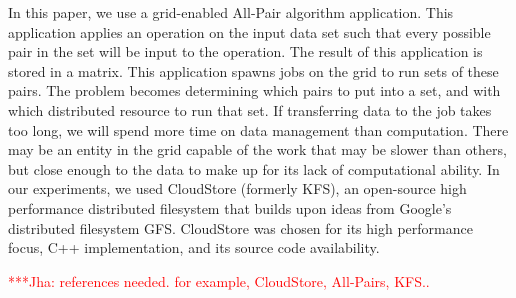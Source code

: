 \documentclass[a4paper,11pt]{article}
\newcommand{\jhanote}[1]{ {\textcolor{red} { ***Jha: #1 }}}
\newcommand{\jhanote}[1]{}
\begin{document}

In this paper, we use a grid-enabled All-Pair algorithm application. This application applies an operation on the input data set such that every possible pair in the set will be input to the operation. The result of this application is stored in a matrix. This application spawns jobs on the grid to run sets of these pairs. The problem becomes determining which pairs to put into a set, and with which distributed resource to run that set. If transferring data to the job takes too long, we will spend more time on data management than computation. There may be an entity in the grid capable of the work that may be slower than others, but close enough to the data to make up for its lack of computational ability. In our experiments, we used CloudStore (formerly KFS), an open-source high performance distributed filesystem that builds upon ideas from Google's distributed filesystem GFS. CloudStore was chosen for its high performance focus, C++ implementation, and its source code availability.

\jhanote{references needed. for example, CloudStore, All-Pairs, KFS.. }
\end{document}
